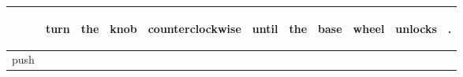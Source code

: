 \documentclass[landscape]{article}
\newcommand{\ssp}{\hspace{2pt}}
\begin{document}
\noindent\begin{tabular}{|l|p{10pt}|p{10pt}|p{10pt}|p{10pt}|p{10pt}|p{10pt}|p{10pt}|p{10pt}|p{10pt}|p{10pt}|}
\hline
&\begin{sideways}\cellcolor{ref0}turn\hspace{12pt}\end{sideways}&\begin{sideways}\cellcolor{ref1}the\hspace{12pt}\end{sideways}&\begin{sideways}\cellcolor{ref2}knob\hspace{12pt}\end{sideways}&\begin{sideways}\cellcolor{ref3}counterclockwise\hspace{12pt}\end{sideways}&\begin{sideways}\cellcolor{ref4}until\hspace{12pt}\end{sideways}&\begin{sideways}\cellcolor{ref5}the\hspace{12pt}\end{sideways}&\begin{sideways}\cellcolor{ref6}base\hspace{12pt}\end{sideways}&\begin{sideways}\cellcolor{ref7}wheel\hspace{12pt}\end{sideways}&\begin{sideways}\cellcolor{ref8}unlocks\hspace{12pt}\end{sideways}&\begin{sideways}\cellcolor{ref9}.\hspace{12pt}\end{sideways}\\
\hline
\ssp push \ssp&\hspace{2pt}&\hspace{2pt}&\hspace{2pt}&\hspace{2pt}&\hspace{2pt}&\hspace{2pt}&\hspace{2pt}&\hspace{2pt}&\hspace{2pt}&\hspace{2pt}\\

\end{tabular}
\end{document}
